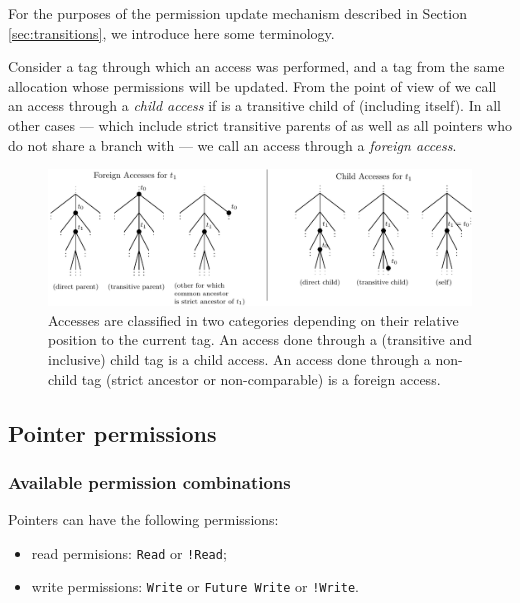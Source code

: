 \documentclass[a4paper,11pt]{article}
\theoremstyle{plain}
\theoremstyle{definition}
\theoremstyle{remark}
\newcommand{\tcode}[1]{\rstinline{#1}}
\newcommand{\tperm}[1]{\texttt{#1}}
\begin{document}
For the purposes of the permission update mechanism described in Section \ref{sec:transitions},
we introduce here some terminology.

Consider a tag \tcode{t0} through which an access was performed, and a tag
\tcode{t1} from the same allocation whose permissions will be updated. From the point
of view of \tcode{t1} we call an access through \tcode{t0} a \textit{child access}
if \tcode{t0} is a transitive child of \tcode{t1} (including \tcode{t1} itself).
In all other cases --- which include strict transitive parents of \tcode{t1} as well as
all pointers who do not share a branch with \tcode{t1} --- we call an access through
\tcode{t0} a \textit{foreign access}.

\begin{figure}
    \includegraphics[width=\textwidth]{../figs/accesses-kinds.pdf}
    \caption{Accesses are classified in two categories depending on their relative position
    to the current tag. An access done through a (transitive and inclusive) child tag is a child access.
    An access done through a non-child tag (strict ancestor or non-comparable) is a foreign access.}
    \label{fig:kinds-of-accesses}
\end{figure}


\subsection{Pointer permissions}

\subsubsection{Available permission combinations}

Pointers can have the following permissions:
\begin{itemize}
    \item read permisions: \tperm{Read} or \tperm{!Read};
    \item write permissions: \tperm{Write} or \tperm{Future Write} or \tperm{!Write}.
\end{itemize}
\end{document}
